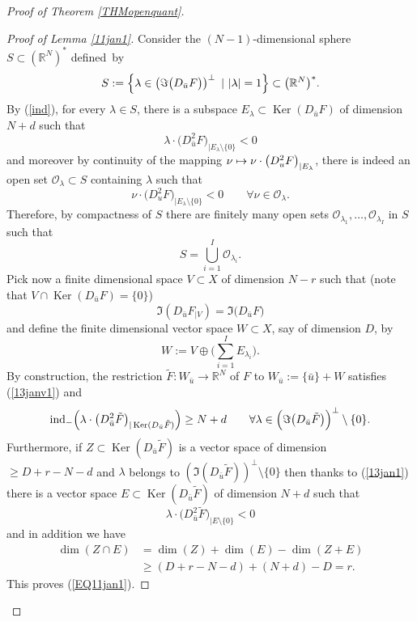 \documentclass[JEP,XML,SOM,Unicode,NoFloatCountersInSection,published]{cedram}
\newcommand\mto{\mathchoice{\longmapsto}{\mapsto}{\mapsto}{\mapsto}}
\DeclareMathOperator{\Ker}{Ker}
\newcommand\R{\mathbb R}
\theoremstyle{definition}
\begin{document}
\begin{proof}[Proof of Theorem \ref{THMopenquant}]
\begin{proof}[Proof of Lemma \ref{11jan1}]
Consider the $(N\!-\!1)$-dimensional sphere $S \!\subset\! (\R^N)^*$ \hbox{defined}~by
\[
S:= \Bigl\{ \lambda \in \left(\Im \bigl(D_{\bar{u}} F \bigr)\right)^{\perp} \ \vert \ | \lambda|=1 \Bigr\} \subset \bigl(\R^N\bigr)^*.
\]
By (\ref{ind}), for every $\lambda \in S$, there is a subspace $E_{\lambda}\subset \Ker \left(D_{\bar{u}}F\right)$ of dimension $N+d$ such that
\[
\lambda \cdot \bigl(D^2_{\bar{u}} F\bigr)_{\vert E_{\lambda} \setminus \{0\}} <0
\]
and moreover by continuity of the mapping $\nu \mto \nu \cdot \left(D^2_{u} F\right)_{\vert E_{\lambda}}$, there is indeed an open set $\mathcal{O}_{\lambda}\subset S$ containing $\lambda$ such that
\[
\nu \cdot \bigl(D^2_{u} F \bigr)_{\vert E_{\lambda} \setminus \{0\}} <0 \qquad \forall \nu \in \mathcal{O}_{\lambda}.
\]
Therefore, by compactness of $S$ there are finitely many open sets $\mathcal{O}_{\lambda_1}, \ldots, \mathcal{O}_{\lambda_I}$ in $S$ such that
\[
S = \bigcup_{i=1}^I \mathcal{O}_{\lambda_i}.
\]
Pick now a finite dimensional space $V\subset X$ of dimension $N-r$ such that (note that $V\cap \Ker(D_{\bar{u}}F)=\{0\}$)
\[
\Im \left(D_{\bar{u}}F_{\vert V}\right) = \Im \bigl(D_{\bar{u}} F\bigr)
\]
and define the finite dimensional vector space $W\subset X$, say of dimension $D$, by
\[
W := V \oplus
\biggl(\sum_{i=1}^I E_{\lambda_i} \biggr).
\]
By construction, the restriction $\tilde{F}:W_{\bar{u}} \to \R^N$ of $F$ to $W_{\bar{u}} := \{\bar{u}\} + W$ satisfies (\ref{13janv1}) and
\begin{equation}\label{13jan1}
\mathrm{ind}_- \Bigl(\lambda \cdot \bigl(D^2_{\bar{u}} \tilde{F} \bigr)_{\vert \Ker (D_{\bar{u}} \tilde{F})} \Bigr) \geq N+d \qquad \forall \lambda \in \Bigl(\Im \bigl(D_{\bar{u}} \tilde{F} \bigr)\Bigr)^{\perp} \setminus \{0\}.
\end{equation}
Furthermore, if $Z\subset \Ker (D_{\bar{u}} \tilde{F})$ is a vector space of dimension $\geq D+r-N-d$ and $\lambda$ belongs to $(\Im (D_{\bar{u}} \tilde{F}))^{\perp} \setminus \{0\}$ then thanks to (\ref{13jan1}) there is a vector space $E\subset \Ker (D_{\bar{u}} \tilde{F})$ of dimension $N+d$ such that
\[
\lambda \cdot \bigl(D^2_{\bar{u}} \tilde{F} \bigr)_{\vert E \setminus \{0\}} <0
\]
and in addition we have
\begin{align*}
\dim (Z\cap E) & =  \dim (Z) + \dim(E) - \dim (Z+E) \\
& \geq  (D+r-N-d) + (N+d) - D=r.
\end{align*}
This proves (\ref{EQ11jan1}).
\end{proof}


\end{proof}
\end{document}
